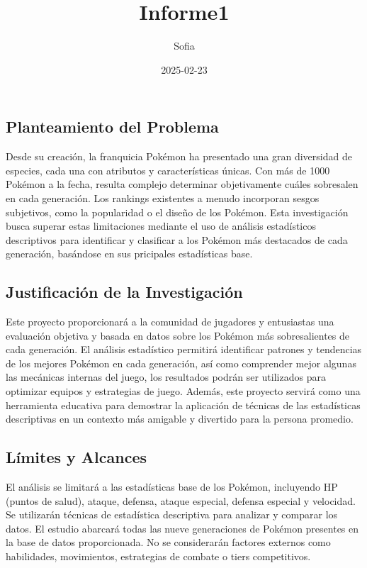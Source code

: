 \documentclass[
]{article}
\title{Informe1}
\author{Sofia}
\date{2025-02-23}
\begin{document}
\maketitle

\subsection{Planteamiento del
Problema}\label{planteamiento-del-problema}

Desde su creación, la franquicia Pokémon ha presentado una gran
diversidad de especies, cada una con atributos y características únicas.
Con más de 1000 Pokémon a la fecha, resulta complejo determinar
objetivamente cuáles sobresalen en cada generación. Los rankings
existentes a menudo incorporan sesgos subjetivos, como la popularidad o
el diseño de los Pokémon. Esta investigación busca superar estas
limitaciones mediante el uso de análisis estadísticos descriptivos para
identificar y clasificar a los Pokémon más destacados de cada
generación, basándose en sus pricipales estadísticas base.

\subsection{Justificación de la
Investigación}\label{justificaciuxf3n-de-la-investigaciuxf3n}

Este proyecto proporcionará a la comunidad de jugadores y entusiastas
una evaluación objetiva y basada en datos sobre los Pokémon más
sobresalientes de cada generación. El análisis estadístico permitirá
identificar patrones y tendencias de los mejores Pokémon en cada
generación, así como comprender mejor algunas las mecánicas internas del
juego, los resultados podrán ser utilizados para optimizar equipos y
estrategias de juego. Además, este proyecto servirá como una herramienta
educativa para demostrar la aplicación de técnicas de las estadísticas
descriptivas en un contexto más amigable y divertido para la persona
promedio.

\subsection{Límites y Alcances}\label{luxedmites-y-alcances}

El análisis se limitará a las estadísticas base de los Pokémon,
incluyendo HP (puntos de salud), ataque, defensa, ataque especial,
defensa especial y velocidad. Se utilizarán técnicas de estadística
descriptiva para analizar y comparar los datos. El estudio abarcará
todas las nueve generaciones de Pokémon presentes en la base de datos
proporcionada. No se considerarán factores externos como habilidades,
movimientos, estrategias de combate o tiers competitivos.
\end{document}
